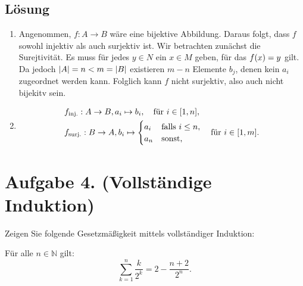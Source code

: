\documentclass[german,12pt]{homework}
\newcommand{\NN}{\mathbb{N}}
\DeclarePairedDelimiter{\absolute}{\lvert}{\rvert}
\DeclarePairedDelimiter{\enbrace}{(}{)}
\DeclarePairedDelimiter{\benbrace}{[}{]}
\begin{document}
    \subsection*{Lösung}
    \begin{enumerate}
        \item Angenommen, \(f: A \to B\) wäre eine bijektive Abbildung. Daraus
        folgt, dass \(f\) sowohl injektiv als auch surjektiv ist. Wir
        betrachten zunächst die Surejtivität. Es muss für jedes \(y \in N\) ein
        \(x \in M\) geben, für das \(f\enbrace*{x} = y\) gilt. Da jedoch
        \(\absolute*{A} = n < m = \absolute*{B}\) existieren \(m - n\) Elemente
        \(b_j\), denen kein \(a_i\) zugeordnet werden kann. Folglich kann \(f\)
        nicht surjektiv, also auch nicht bijekitv sein.
        \item
        \begin{align*}
            &f_\text{inj.}: A \to B, a_i \mapsto b_i, \quad \text{für }i \in
            \benbrace*{1, n},\\
            &f_\text{surj.}: B \to A, b_i \mapsto \begin{cases}
                a_i & \text{falls }i \le n,\\
                a_n & \text{sonst,}
            \end{cases} \quad \text{für }i \in \benbrace*{1, m}.
        \end{align*}
    \end{enumerate}

    \section*{Aufgabe 4. (Vollständige Induktion)}

    \begin{problem}
        Zeigen Sie folgende Gesetzmäßigkeit mittels vollständiger Induktion:

        Für alle \(n \in \NN\) gilt:
        \[\sum_{k = 1}^n\frac{k}{2^k} = 2 - \frac{n + 2}{2^n}.\]
    \end{problem}
\end{document}
